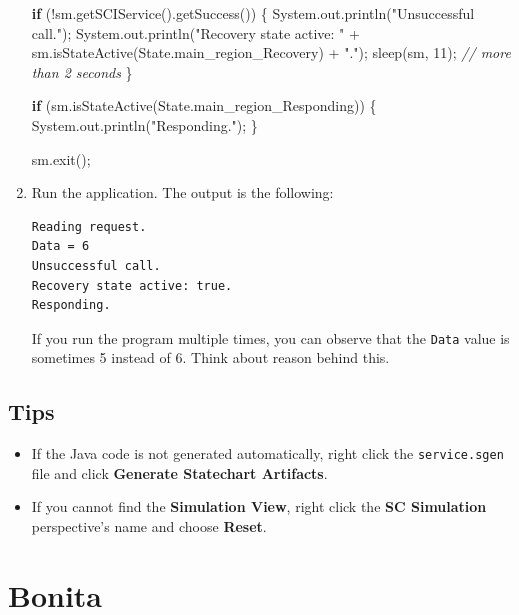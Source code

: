 \documentclass[]{report}
\newenvironment{Shaded}{}{}
\newcommand{\KeywordTok}[1]{\textcolor[rgb]{0.00,0.44,0.13}{\textbf{{#1}}}}
\newcommand{\DecValTok}[1]{\textcolor[rgb]{0.25,0.63,0.44}{{#1}}}
\newcommand{\StringTok}[1]{\textcolor[rgb]{0.25,0.44,0.63}{{#1}}}
\newcommand{\CommentTok}[1]{\textcolor[rgb]{0.38,0.63,0.69}{\textit{{#1}}}}
\newcommand{\FunctionTok}[1]{\textcolor[rgb]{0.02,0.16,0.49}{{#1}}}
\newcommand{\NormalTok}[1]{{#1}}
\begin{document}
\begin{enumerate}
\begin{Shaded}
\begin{Highlighting}[]
\KeywordTok{if} \NormalTok{(!sm.}\FunctionTok{getSCIService}\NormalTok{().}\FunctionTok{getSuccess}\NormalTok{()) \{}
  \NormalTok{System.}\FunctionTok{out}\NormalTok{.}\FunctionTok{println}\NormalTok{(}\StringTok{"Unsuccessful call."}\NormalTok{);}
  \NormalTok{System.}\FunctionTok{out}\NormalTok{.}\FunctionTok{println}\NormalTok{(}\StringTok{"Recovery state active: "} \NormalTok{+ }
    \NormalTok{sm.}\FunctionTok{isStateActive}\NormalTok{(State.}\FunctionTok{main_region_Recovery}\NormalTok{) + }\StringTok{"."}\NormalTok{);}
  \FunctionTok{sleep}\NormalTok{(sm, }\DecValTok{11}\NormalTok{); }\CommentTok{// more than 2 seconds}
\NormalTok{\}}

\KeywordTok{if} \NormalTok{(sm.}\FunctionTok{isStateActive}\NormalTok{(State.}\FunctionTok{main_region_Responding}\NormalTok{)) \{}
  \NormalTok{System.}\FunctionTok{out}\NormalTok{.}\FunctionTok{println}\NormalTok{(}\StringTok{"Responding."}\NormalTok{);}
\NormalTok{\}}

\NormalTok{sm.}\FunctionTok{exit}\NormalTok{();}
\end{Highlighting}
\end{Shaded}
\item
  Run the application. The output is the following:

\begin{verbatim}
Reading request.
Data = 6
Unsuccessful call.
Recovery state active: true.
Responding.
\end{verbatim}

  If you run the program multiple times, you can observe that the
  \texttt{Data} value is sometimes 5 instead of 6. Think about reason
  behind this.
\end{enumerate}

\section{Tips}

\begin{itemize}
\itemsep1pt\parskip0pt
\item
  If the Java code is not generated automatically, right click the
  \texttt{service.sgen} file and click \textbf{Generate Statechart
  Artifacts}.
\item
  If you cannot find the \textbf{Simulation View}, right click the
  \textbf{SC Simulation} perspective's name and choose \textbf{Reset}.
\end{itemize}

\chapter{Bonita}
\end{document}
